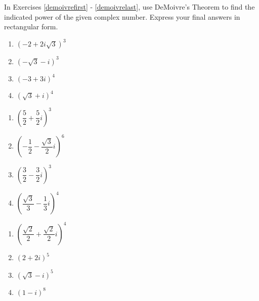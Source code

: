 \documentclass{ximera}
\begin{document}
In Exercises \ref{demoivrefirst} - \ref{demoivrelast}, use DeMoivre's Theorem to find the indicated power of the given complex number.  Express your final answers in rectangular form.

\begin{multicols}{4}

\begin{enumerate}

\setcounter{enumi}{\value{HW}}

\item $\left(-2 + 2i\sqrt{3}\right)^3$ \label{demoivrefirst}
\item $(-\sqrt{3} - i)^3$ 
\item $(-3+3i)^{4}$
\item $(\sqrt{3} + i)^4$

\setcounter{HW}{\value{enumi}}

\end{enumerate}

\end{multicols}

\begin{multicols}{4} 

\begin{enumerate}

\setcounter{enumi}{\value{HW}}

\item $\left(\dfrac{5}{2} + \dfrac{5}{2} i\right)^3$ 
\item $\left(-\dfrac{1}{2} - \dfrac{\sqrt{3}}{2} i\right)^{6}$
\item $\left(\dfrac{3}{2} - \dfrac{3}{2} i\right)^3$ 
\item $\left(\dfrac{\sqrt{3}}{3} - \dfrac{1}{3} i\right)^4$

\setcounter{HW}{\value{enumi}}

\end{enumerate}

\end{multicols}

\begin{multicols}{4} 

\begin{enumerate}

\setcounter{enumi}{\value{HW}}

\item $\left(\dfrac{\sqrt{2}}{2} + \dfrac{\sqrt{2}}{2} i\right)^4$
\item $(2+2i)^5$ 
\item $(\sqrt{3} - i)^{5}$ 
\item $(1-i)^8$  \label{demoivrelast}

\setcounter{HW}{\value{enumi}}

\end{enumerate}

\end{multicols}
\end{document}
